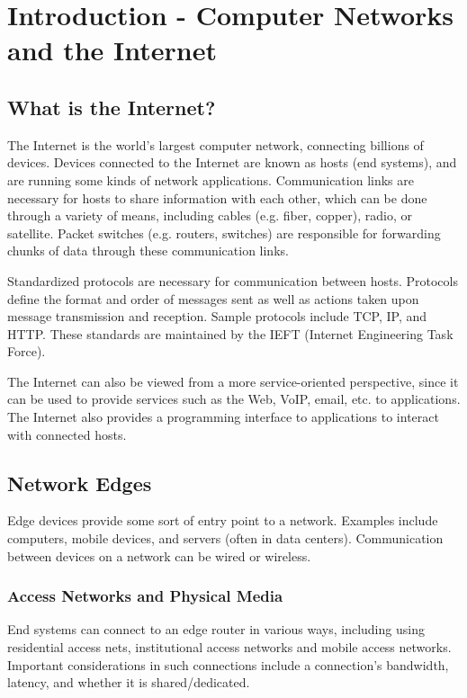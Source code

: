 \documentclass[12pt,titlepage]{article}
\begin{document}
  \newpage

  \section{Introduction - Computer Networks and the Internet}
    \subsection{What is the Internet?}
      The Internet is the world's largest computer network, connecting billions of devices. Devices
      connected to the Internet are known as hosts (end systems), and are running some kinds of network applications.
      Communication links are necessary for hosts to share information with each other, which can be done through
      a variety of means, including cables (e.g. fiber, copper), radio, or satellite. Packet switches (e.g. routers,
      switches) are responsible for forwarding chunks of data through these communication links.

      Standardized protocols are necessary for communication between hosts. Protocols define the format and order of
      messages sent as well as actions taken upon message transmission and reception. Sample protocols include TCP, IP, and HTTP.
      These standards are maintained by the IEFT (Internet Engineering Task Force).

      The Internet can also be viewed from a more service-oriented perspective, since it can be used to provide
      services such as the Web, VoIP, email, etc. to applications. The Internet also provides a programming interface
      to applications to interact with connected hosts.

    \subsection{Network Edges}
      Edge devices provide some sort of entry point to a network. Examples include computers, mobile devices, and servers
      (often in data centers). Communication between devices on a network can be wired or wireless.

      \subsubsection{Access Networks and Physical Media}
        End systems can connect to an edge router in various ways, including using residential access nets, institutional
        access networks and mobile access networks. Important considerations in such connections include a connection's bandwidth,
        latency, and whether it is shared/dedicated.
\end{document}
